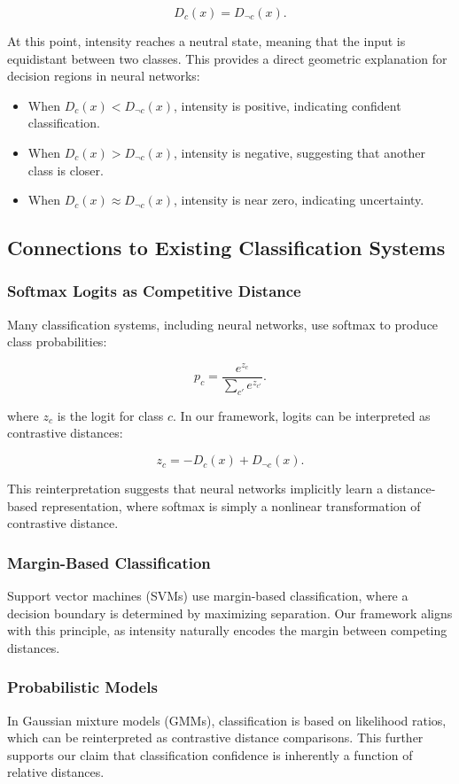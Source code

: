 \[
D_c(x) = D_{\neg c}(x).
\]

At this point, intensity reaches a neutral state, meaning that the input is equidistant between two classes. This provides a direct geometric explanation for decision regions in neural networks: 

\begin{itemize}
    \item When \( D_c(x) < D_{\neg c}(x) \), intensity is positive, indicating confident classification.
    \item When \( D_c(x) > D_{\neg c}(x) \), intensity is negative, suggesting that another class is closer.
    \item When \( D_c(x) \approx D_{\neg c}(x) \), intensity is near zero, indicating uncertainty.
\end{itemize}

\subsection{Connections to Existing Classification Systems}

\subsubsection{Softmax Logits as Competitive Distance}
Many classification systems, including neural networks, use softmax to produce class probabilities:

\[
p_c = \frac{e^{z_c}}{\sum_{c'} e^{z_{c'}}}.
\]

where \( z_c \) is the logit for class \( c \). In our framework, logits can be interpreted as contrastive distances:

\[
z_c = -D_c(x) + D_{\neg c}(x).
\]

This reinterpretation suggests that neural networks implicitly learn a distance-based representation, where softmax is simply a nonlinear transformation of contrastive distance.

\subsubsection{Margin-Based Classification}
Support vector machines (SVMs) use margin-based classification, where a decision boundary is determined by maximizing separation. Our framework aligns with this principle, as intensity naturally encodes the margin between competing distances.

\subsubsection{Probabilistic Models}
In Gaussian mixture models (GMMs), classification is based on likelihood ratios, which can be reinterpreted as contrastive distance comparisons. This further supports our claim that classification confidence is inherently a function of relative distances.

